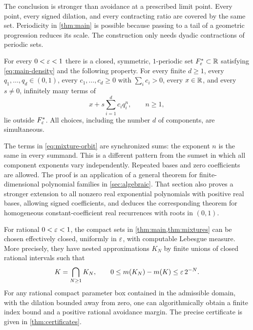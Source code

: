 The conclusion is stronger than avoidance at a prescribed limit point.
Every point, every signed dilation, and every contracting ratio are covered
by the same set. Periodicity in \cref{thm:main} is possible because passing
to a tail of a geometric progression reduces its scale. The construction
only needs dyadic contractions of periodic sets.

\begin{theorem}\label{thm:mixtures}
For every $0<\varepsilon<1$ there is a closed, symmetric, $1$-periodic set
$F^*_\varepsilon\subset\mathbb R$ satisfying \eqref{eq:main-density} and the following
property. For every finite $d\ge1$, every $q_1,\ldots,q_d\in(0,1)$,
every $c_1,\ldots,c_d\ge0$ with $\sum_i c_i>0$, every $x\in\mathbb R$, and
every $s\ne0$, infinitely many terms of
\begin{equation}\label{eq:mixture-orbit}
 x+s\sum_{i=1}^d c_iq_i^n,\qquad n\ge1,
\end{equation}
lie outside $F^*_\varepsilon$. All choices, including the number $d$ of
components, are simultaneous.
\end{theorem}

The terms in \eqref{eq:mixture-orbit} are synchronized sums: the exponent
$n$ is the same in every summand. This is a different pattern from the
sumset in which all component exponents vary independently. Repeated
bases and zero coefficients are allowed. The proof is an application of
a general theorem for finite-dimensional polynomial families in
\cref{sec:algebraic}. That section also proves a stronger extension to
all nonzero real exponential polynomials with positive real bases,
allowing signed coefficients, and deduces the corresponding theorem
for homogeneous constant-coefficient real recurrences with roots in $(0,1)$.

\begin{theorem}\label{thm:effective-intro}
For rational $0<\varepsilon<1$, the compact sets in \cref{thm:main,thm:mixtures}
can be chosen effectively closed, uniformly in $\varepsilon$, with computable
Lebesgue measure. More precisely, they have nested approximations $K_N$
by finite unions of closed rational intervals such that
\begin{equation}\label{eq:effective-rate-intro}
 K=\bigcap_{N\ge1}K_N,
 \qquad 0\le m(K_N)-m(K)\le\varepsilon\,2^{-N}.
\end{equation}
For any rational compact parameter box contained in the admissible domain,
with the dilation bounded away from zero, one can algorithmically obtain a finite index bound and a
positive rational avoidance margin. The precise certificate is given in
\cref{thm:certificates}.
\end{theorem}

